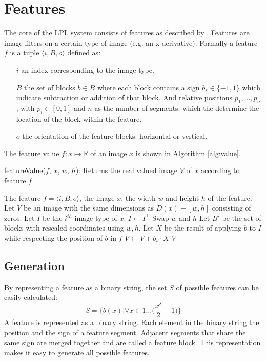 \documentclass[a4paper,11pt]{article}
\begin{document}
\section*{Features}
The core of the LPL system consists of features as described by
\cite{dlagnekov_thesis, zhang,naturaltext}. Features are image filters on a
certain type of image (e.g.  an x-derivative). Formally a feature $f$ is a
tuple $\langle i, B, o \rangle$ defined as:
\begin{itemize}
	\item[$i$]{an index corresponding to the image type.}
	\item[$B$]{the set of blocks $b \in B$ where each block contains a sign
	$b_s \in \{-1,1\}$ which indicate subtraction or addition of that block. And
	relative positions $p_1,\ldots,p_n$, with $p_i \in [0,1]$ and $n$ as the number
	of segments. which the determine the location of the block within the feature.}
	\item[$o$]{the orientation of the feature blocks: horizontal or vertical.}
\end{itemize}
The feature value $f:x\mapsto\mathbb{R}$ of an image $x$ is shown in Algorithm
\ref{alg:value}.
\begin{algorithm}
	\caption{featureValue($f$, $x$, $w$, $h$): Returns the real valued image $V$ of $x$ according to feature $f$}
	\begin{algorithmic}[1]
	\REQUIRE The feature $f = \langle i, B, o \rangle$, the image $x$, the width $w$ and height $h$ of the feature.
	\medskip
	\STATE Let $V$ be an image with the same dimensions as $D(x)-[w, h]$ consisting of zeros.
	\STATE Let $I$ be the $i^{th}$ image type of $x$.
		\STATE $I \leftarrow I^\top$
		\STATE Swap $w$ and $h$
	\ENDIF
	\STATE Let $B'$ be the set of blocks with rescaled coordinates using $w,h$.
		\STATE Let $X$ be the result of applying $b$ to $I$ while respecting the position of $b$ in $f$
		\STATE $V \leftarrow V + b_s \cdot X$
	\ENDFOR
	\RETURN $V$
	\end{algorithmic}
\label{alg:value}
\end{algorithm}

\subsection*{Generation}
By representing a feature as a binary string, the set $S$ of possible features can be easily calculated:
$$S = \{b(x) | \forall x \in 1\ldots\Big(\frac{x^s}{2}-1\Big)\}$$
A feature is represented as a binary string. Each element in the binary string
the position and the sign of a feature segment. Adjacent segments that share
the same sign are merged together and are called a feature block. This
representation makes it easy to generate all possible features.
\end{document}
